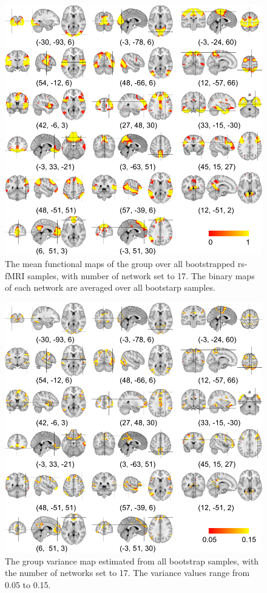 \documentclass[review,authoryear]{elsarticle}
\begin{document}
\begin{figure}
\includegraphics[width=1.0\textwidth]{figures/17networks/grp_mean}
\caption{The mean functional maps of the group over all bootstrapped rs-fMRI
  samples, with number of network set to 17. The binary maps of each network are
  averaged over all bootstarp samples.}
\end{figure}

\begin{figure}
\includegraphics[width=1.0\textwidth]{figures/17networks/grp_var}
\caption{The group variance map estimated from all bootstrap samples, with the
  number of networks set to 17. The variance values range from 0.05 to 0.15. }
\end{figure}
\end{document}
